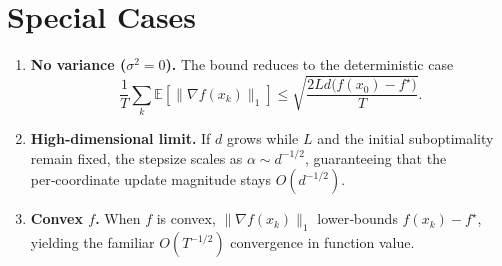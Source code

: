 \documentclass{article}
\newcommand{\E}{\mathbb{E}}
\begin{document}
\section*{Special Cases}
\begin{enumerate}[leftmargin=*]
\item \textbf{No variance ($\sigma^{2}=0$).} The bound reduces to the deterministic case
\[
\frac{1}{T}\sum_{k}\E[\|\nabla f(x_{k})\|_{1}]
\le \sqrt{\frac{2L d\bigl(f(x_{0})-f^{\star}\bigr)}{T}}.
\]
\item \textbf{High‑dimensional limit.} If $d$ grows while $L$ and the initial suboptimality remain fixed, the stepsize scales as $\alpha\sim d^{-1/2}$, guaranteeing that the per‑coordinate update magnitude stays $O(d^{-1/2})$.
\item \textbf{Convex $f$.} When $f$ is convex, $\|\nabla f(x_{k})\|_{1}$ lower‑bounds $f(x_{k})-f^{\star}$, yielding the familiar $O(T^{-1/2})$ convergence in function value.
\end{enumerate}
\end{document}
